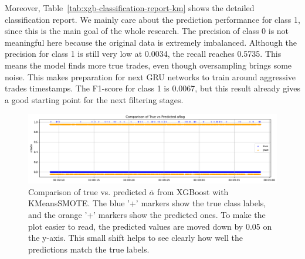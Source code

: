 Moreover, Table~\ref{tab:xgb-classification-report-km} shows the detailed classification report. We mainly care about the prediction performance for class 1, since this is the main goal of the whole research. The precision of class 0 is not meaningful here because the original data is extremely imbalanced. Although the precision for class 1 is still very low at 0.0034, the recall reaches 0.5735. This means the model finds more true trades, even though oversampling brings some noise. This makes preparation for next GRU networks to train around aggressive trades timestamps. The F1-score for class 1 is 0.0067, but this result already gives a good starting point for the next filtering stages.


\begin{figure}[H]
    \centering
    \includegraphics[width=\textwidth]{figures/XGBoost comparison1.png}
    \caption{Comparison of true vs. predicted $\bar{\alpha}$ from XGBoost with KMeansSMOTE. 
    The blue '+' markers show the true class labels, and the orange '+' markers show the predicted ones. To make the plot easier to read, the predicted values are moved down by 0.05 on the y-axis. This small shift helps to see clearly how well the predictions match the true labels.
    }
    \label{fig:xgb-pred-vs-true-km}
\end{figure}

